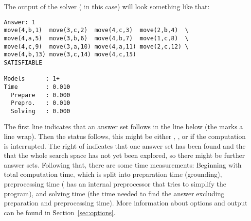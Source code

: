 The output of the solver (\clingo{} in this case) will look something like that:
\begin{lstlisting}[numbers=none]
Answer: 1
move(4,b,1)  move(3,c,2)  move(4,c,3)  move(2,b,4)  \
move(4,a,5)  move(3,b,6)  move(4,b,7)  move(1,c,8)  \
move(4,c,9)  move(3,a,10) move(4,a,11) move(2,c,12) \
move(4,b,13) move(3,c,14) move(4,c,15) 
SATISFIABLE

Models      : 1+    
Time        : 0.010
  Prepare   : 0.000
  Prepro.   : 0.010
  Solving   : 0.000
\end{lstlisting}
The first line indicates that an answer set follows in the line below (the \code{\textbackslash} marks a line wrap).
Then the status follows, this might be either , , or  
if the computation is interrupted.
The \code{1+} right of \code{Models:} indicates that one answer set has been found and the \code{+} that 
the whole search space has not yet been explored, so there might be further answer sets.
Following that, there are some time measurements: 
Beginning with total computation time, 
which is split into 
preparation time (grounding), 
preprocessing time (\clasp{} has an internal preprocessor that tries to simplify the program), 
and solving time (the time needed to find the answer excluding preparation and preprocessing time).
More information about options and output can be found in Section~\ref{sec:options}.